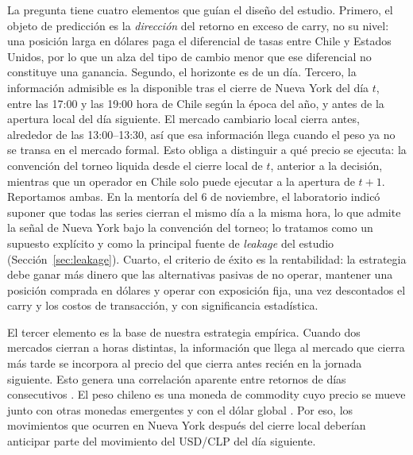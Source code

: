 \documentclass[11pt,a4paper]{article}
\begin{document}
La pregunta tiene cuatro elementos que guían el diseño del estudio. Primero, el objeto de predicción es la \emph{dirección} del retorno en exceso de carry, no su nivel: una posición larga en dólares paga el diferencial de tasas entre Chile y Estados Unidos, por lo que un alza del tipo de cambio menor que ese diferencial no constituye una ganancia. Segundo, el horizonte es de un día. Tercero, la información admisible es la disponible tras el cierre de Nueva York del día \(t\), entre las 17:00 y las 19:00 hora de Chile según la época del año, y antes de la apertura local del día siguiente. El mercado cambiario local cierra antes, alrededor de las 13:00--13:30, así que esa información llega cuando el peso ya no se transa en el mercado formal. Esto obliga a distinguir a qué precio se ejecuta: la convención del torneo liquida desde el cierre local de \(t\), anterior a la decisión, mientras que un operador en Chile solo puede ejecutar a la apertura de \(t+1\). Reportamos ambas. En la mentoría del 6 de noviembre, el laboratorio indicó suponer que todas las series cierran el mismo día a la misma hora, lo que admite la señal de Nueva York bajo la convención del torneo; lo tratamos como un supuesto explícito y como la principal fuente de \emph{leakage} del estudio (Sección~\ref{sec:leakage}). Cuarto, el criterio de éxito es la rentabilidad: la estrategia debe ganar más dinero que las alternativas pasivas de no operar, mantener una posición comprada en dólares y operar con exposición fija, una vez descontados el carry y los costos de transacción, y con significancia estadística.

El tercer elemento es la base de nuestra estrategia empírica. Cuando dos mercados cierran a horas distintas, la información que llega al mercado que cierra más tarde se incorpora al precio del que cierra antes recién en la jornada siguiente. Esto genera una correlación aparente entre retornos de días consecutivos \citep{scholes1977,lo1990}. El peso chileno es una moneda de commodity cuyo precio se mueve junto con otras monedas emergentes y con el dólar global \citep{chen2003,lustig2011}. Por eso, los movimientos que ocurren en Nueva York después del cierre local deberían anticipar parte del movimiento del USD/CLP del día siguiente.
\end{document}
